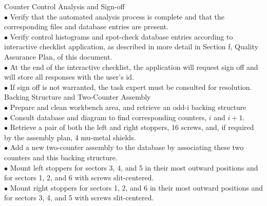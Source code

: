Counter Control Analysis and Sign-off\\

$\bullet$ Verify that the automated analysis process is complete and that the
corresponding files and database entries are present.\\
$\bullet$ Verify control histograms and spot-check database entries according to
interactive checklist application, as described in more detail in Section f,
Quality Assurance Plan, of this document.\\
$\bullet$ At the end of the interactive checklist, the application will request sign off and
will store all responses with the user's id.\\
$\bullet$ If sign off is not warranted, the task expert must be consulted for resolution.
Backing Structure and Two-Counter Assembly\\

$\bullet$ Prepare and clean workbench area, and retrieve an odd-i backing structure\\
$\bullet$ Consult database and diagram to find corresponding counters, $i$ and $i+1$.\\
$\bullet$ Retrieve a pair of both the left and right stoppers, 16 screws, and, if required by
the assembly plan, 4 mu-metal shields.\\
$\bullet$ Add a new two-counter assembly to the database by associating these two
counters and this backing structure.\\
$\bullet$ Mount left stoppers for sectors 3, 4, and 5 in their most outward positions and
for sectors 1, 2, and 6 with screws slit-centered.\\
$\bullet$ Mount right stoppers for sectors 1, 2, and 6 in their most outward positions and
for sectors 3, 4, and 5 with screws slit-centered.\\

